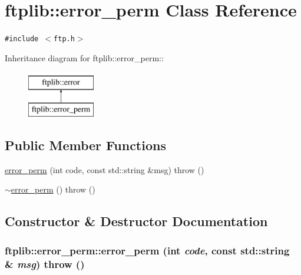 \hypertarget{classftplib_1_1error__perm}{
\section{ftplib::error\_\-perm Class Reference}
\label{classftplib_1_1error__perm}
}
{\tt \#include $<$ftp.h$>$}

Inheritance diagram for ftplib::error\_\-perm::\begin{figure}[H]
\begin{center}
\leavevmode
\includegraphics[height=2cm]{classftplib_1_1error__perm}
\end{center}
\end{figure}
\subsection*{Public Member Functions}
\begin{CompactItemize}
\item 
\hyperlink{classftplib_1_1error__perm_f39cb3638a78e6967e56d1f7e7346bfb}{error\_\-perm} (int code, const std::string \&msg)  throw ()
\item 
\hyperlink{classftplib_1_1error__perm_2d105a24ed475f01ed72bf1ce8f53fe8}{$\sim$error\_\-perm} ()  throw ()
\end{CompactItemize}


\subsection{Constructor \& Destructor Documentation}
\hypertarget{classftplib_1_1error__perm_f39cb3638a78e6967e56d1f7e7346bfb}{
\subsubsection[{error\_\-perm}]{\setlength{\rightskip}{0pt plus 5cm}ftplib::error\_\-perm::error\_\-perm (int {\em code}, \/  const std::string \& {\em msg})  throw ()}}
\label{classftplib_1_1error__perm_f39cb3638a78e6967e56d1f7e7346bfb}


